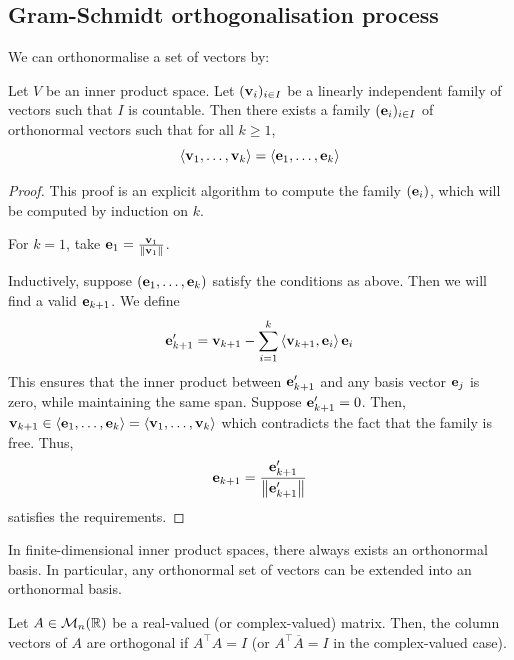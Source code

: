 \documentclass[a4paper]{article}
\begin{document}
\subsection{Gram-Schmidt orthogonalisation process}
We can orthonormalise a set of vectors by:
\begin{theorem}
	Let \( V \) be an inner product space.
	Let \( ({\bf v}_i)_{i \in I} \) be a linearly independent family of vectors such that \( I \) is countable.
	Then there exists a family \( ({\bf e}_i)_{i \in I} \) of orthonormal vectors such that for all \( k \geq 1 \),
	\[
		\left\langle{} {\bf v}_1, \dots, {\bf v}_k \right\rangle = \left\langle{} {\bf e}_1, \dots, {\bf e}_k \right\rangle
	\]
\end{theorem}
\begin{proof}
	This proof is an explicit algorithm to compute the family \( ({\bf e}_i) \), which will be computed by induction on \( k \).
	
	For \( k = 1 \), take \( {\bf e}_1 = \frac{{\bf v}_1}{\norm{{\bf v}_1}} \).

	Inductively, suppose \( ({\bf e}_1, \dots, {\bf e}_k) \) satisfy the conditions as above.
	Then we will find a valid \( {\bf e}_{k+1} \).
	We define
	\[
		{\bf e}_{k+1}' = {\bf v}_{k+1} - \sum_{i=1}^k \left\langle{{\bf v}_{k+1}, {\bf e}_i}\right\rangle {\bf e}_i
	\]
	This ensures that the inner product between \( {\bf e}_{k+1}' \) and any basis vector \( {\bf e}_j \) is zero, while maintaining the same span.
	Suppose \( {\bf e}_{k+1}' = 0 \).
	Then, \( {\bf v}_{k+1} \in \left\langle{} {\bf e}_1, \dots, {\bf e}_k \right\rangle = \left\langle{} {\bf v}_1, \dots, {\bf v}_k \right\rangle \) which contradicts the fact that the family is free.
	Thus,
	\[
		{\bf e}_{k+1} = \frac{{\bf e}_{k+1}'}{\norm{{\bf e}_{k+1}'}}
	\]
	satisfies the requirements.
\end{proof}
\begin{corollary}
	In finite-dimensional inner product spaces, there always exists an orthonormal basis.
	In particular, any orthonormal set of vectors can be extended into an orthonormal basis.
\end{corollary}
\begin{remark}
	Let \( A \in {\mathcal{M}}_n(\mathbb R) \) be a real-valued (or complex-valued) matrix.
	Then, the column vectors of \( A \) are orthogonal if \( A^\top A = I \) (or \( A^\top \overline A = I \) in the complex-valued case).
\end{remark}
\end{document}

